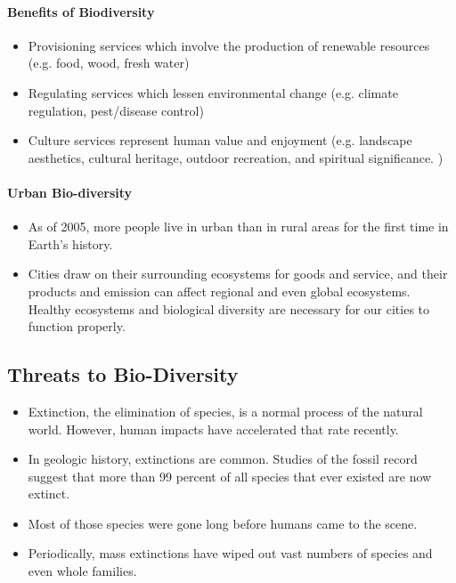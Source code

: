 \documentclass[10pt]{article}
\begin{document}
\paragraph{Benefits of Biodiversity}
\begin{itemize}
    \item Provisioning services which involve the production of renewable resources (e.g. food, wood, fresh water)
    \item Regulating services which lessen environmental change (e.g. climate regulation, pest/disease control)
    \item Culture services represent human value and enjoyment (e.g. landscape aesthetics, cultural heritage, outdoor recreation, and spiritual significance. )
\end{itemize}

\paragraph{Urban Bio-diversity}
\begin{itemize}
    \item As of 2005, more people live in urban than in rural areas for the first time in Earth's history. 
    \item Cities draw on their surrounding ecosystems for goods and service, and their products and emission can affect regional and even global ecosystems. Healthy ecosystems and biological diversity are necessary for our cities to function properly. 
\end{itemize}


\subsection{Threats to Bio-Diversity}
\begin{itemize}
    \item Extinction, the elimination of species, is a normal process of the natural world. However, human impacts have accelerated that rate recently. 
    \item In geologic history, extinctions are common. Studies of the fossil record suggest that more than 99 percent of all species that ever existed are now extinct.
    \item Most of those species were gone long before humans came to the scene.
    \item Periodically, mass extinctions have wiped out vast numbers of species and even whole families.  
\end{itemize}
\end{document}
